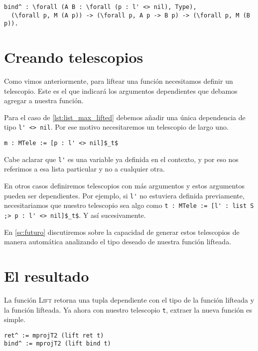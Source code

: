 \begin{lstlisting}[float=h,frame=tb,caption={Signatura deseada de \lstinline{bind}},label=lst:bind_motiv]
bind^ : \forall (A B : \forall (p : l' <> nil), Type),
  (\forall p, M (A p)) -> (\forall p, A p -> B p) -> (\forall p, M (B p)).
\end{lstlisting}

\section{Creando telescopios}

Como vimos anteriormente, para liftear una función necesitamos definir un telescopio. Este es el que indicará los argumentos dependientes que debamos agregar a nuestra función.

Para el caso de \ref{lst:list_max_lifted} debemos añadir una única dependencia de tipo \lstinline{l' <> nil}. Por ese motivo necesitaremos un telescopio de largo uno.

\begin{lstlisting}[float=h,frame=tb,caption={Telescopio para \lstinline{list_max}},label=lst:list_max_tele]
m : MTele := [p : l' <> nil]$_t$
\end{lstlisting}

Cabe aclarar que \lstinline{l'} es una variable ya definida en el contexto, y por eso nos referimos a esa lista particular y no a cualquier otra.

En otros casos definiremos telescopios con más argumentos y estos argumentos pueden ser dependientes. Por ejemplo, si \lstinline{l'} no estuviera definida previamente, necesitariamos que nuestro telescopio sea algo como  \lstinline{t : MTele := [l' : list S ;> p : l' <> nil]$_t$}. Y así sucesivamente.

En \ref{sc:futuro} discutiremos sobre la capacidad de generar estos telescopios de manera automática analizando el tipo deseado de nuestra función lifteada.

\section{El resultado}

La función \textsc{Lift} retorna una tupla dependiente con el tipo de la función lifteada y la función lifteada. Ya ahora con nuestro telescopio \lstinline{t}, extraer la nueva función es simple.

\begin{lstlisting}[float=h,frame=tb,caption={Lifteando \lstinline{ret} y \lstinline{bind}},label=lst:lift1]
ret^ := mprojT2 (lift ret t)
bind^ := mprojT2 (lift bind t)
\end{lstlisting}

